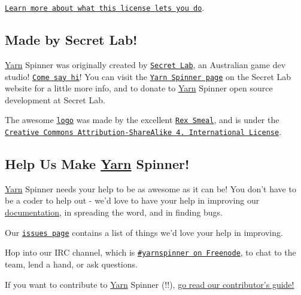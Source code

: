 \begin{DoxyItemize}
\item \href{https://tldrlegal.com/license/mit-license}{\tt Learn more about what this license lets you do}.
\end{DoxyItemize}

\subsection*{Made by Secret Lab!}

\hyperlink{a00026}{Yarn} Spinner was originally created by \href{http://secretlab.com.au}{\tt Secret Lab}, an Australian game dev studio! \href{https://twitter.com/thesecretlab}{\tt Come say hi}! You can visit the \href{http://www.secretlab.com.au/yarnspinner}{\tt Yarn Spinner page} on the Secret Lab website for a little more info, and to donate to \hyperlink{a00026}{Yarn} Spinner open source development at Secret Lab.

The awesome \href{Documentation/YarnSpinnerLogo.png}{\tt logo} was made by the excellent \href{https://twitter.com/RexSmeal}{\tt Rex Smeal}, and is under the \href{http://creativecommons.org/licenses/by-sa/4.0/}{\tt Creative Commons Attribution-\/\-Share\-Alike 4. International License}.

\subsection*{Help Us Make \hyperlink{a00026}{Yarn} Spinner!}

\hyperlink{a00026}{Yarn} Spinner needs your help to be as awesome as it can be! You don't have to be a coder to help out -\/ we'd love to have your help in improving our \hyperlink{a00012}{documentation}, in spreading the word, and in finding bugs.


\begin{DoxyItemize}
\item Our \href{https://github.com/thesecretlab/YarnSpinner/issues}{\tt issues page} contains a list of things we'd love your help in improving.
\item Hop into our I\-R\-C channel, which is \href{https://webchat.freenode.net/?channels=yarnspinner}{\tt \#yarnspinner on Freenode}, to chat to the team, lend a hand, or ask questions.
\end{DoxyItemize}

If you want to contribute to \hyperlink{a00026}{Yarn} Spinner (!!), \hyperlink{a00002}{go read our contributor's guide!} 